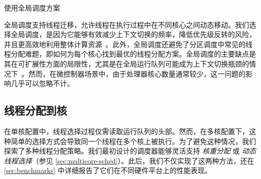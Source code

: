 
\OSname{} 使用全局调度方案

全局调度支持线程迁移，允许线程在执行过程中在不同核心之间动态移动。我们选择全局调度，是因为它能够有效减少上下文切换的频率，降低优先级反转的风险，并且更高效地利用整体计算资源~\cite{hardrealtime-multiprocessor-survey, brandenburg}。此外，全局调度还避免了分区调度中常见的线程分配难题，即如何为每个核心找到最优的线程分配方案。全局调度的主要缺点是其在可扩展性方面的局限性，尤其是在全局运行队列可能成为上下文切换瓶颈的情况下~\cite{EDF-RM-multiprocessor-survey}。然而，在微控制器场景中，由于处理器核心数量通常较少，这一问题的影响几乎可以忽略不计。


\subsection{线程分配到核}
\label{sec:Assigning-Threads-to-Cores}
在单核配置中，线程选择过程仅需读取运行队列的头部。然而，在多核配置下，这种简单的选择方式会导致同一个线程在多个核上被执行。为了避免这种情况，我们探索了多种线程分配策略。我们最初设计的调度器能够灵活支持 \textit{核重分配} 或 \textit{动态线程选择}（参见 \autoref{sec:multicore-sched}）。此后，我们不仅实现了这两种方法，还在 \autoref{sec:benchmarks} 中详细报告了它们在不同硬件平台上的性能表现。

